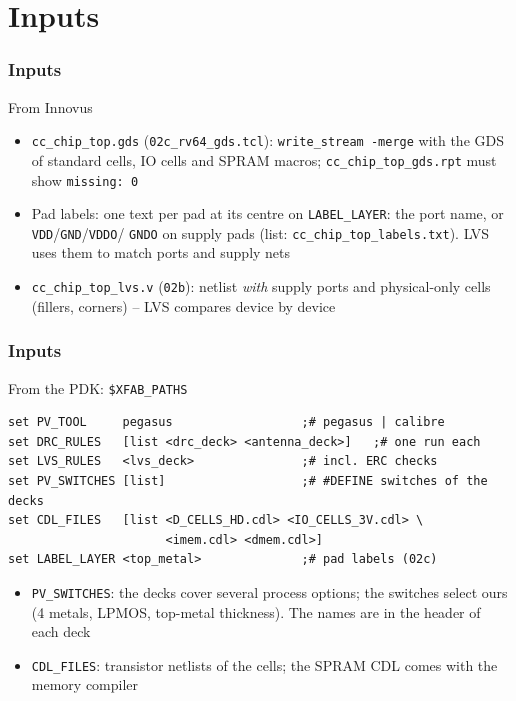 \documentclass{beamer}
\newcommand{\astitle}{nix}
\newcommand{\assubtitle}{nix}
\newcommand{\cmd}[1]{\texttt{#1}}
\begin{document}
\section{Inputs}
\renewcommand{\astitle}{Inputs}

\renewcommand{\assubtitle}{From Innovus}
\begin{frame}
\frametitle{\astitle}
\begin{block}{\assubtitle}
  \begin{itemize}
    \item \cmd{cc\_chip\_top.gds} (\cmd{02c\_rv64\_gds.tcl}):
      \cmd{write\_stream -merge} with the GDS of standard cells, IO cells
      and SPRAM macros; \cmd{cc\_chip\_top\_gds.rpt} must show
      \cmd{missing: 0}
    \item Pad labels: one text per pad at its centre on
      \cmd{LABEL\_LAYER}: the port name, or \cmd{VDD}/\cmd{GND}/\cmd{VDDO}/
      \cmd{GNDO} on supply pads (list: \cmd{cc\_chip\_top\_labels.txt}).
      LVS uses them to match ports and supply nets
    \item \cmd{cc\_chip\_top\_lvs.v} (\cmd{02b}): netlist \emph{with} supply
      ports and physical-only cells (fillers, corners) -- LVS compares
      device by device
  \end{itemize}
\end{block}
\end{frame}

\renewcommand{\assubtitle}{From the PDK: \texttt{\$XFAB\_PATHS}}
\begin{frame}[fragile]
\frametitle{\astitle}
\begin{block}{\assubtitle}
\begin{lstlisting}[style=sh]
set PV_TOOL     pegasus                  ;# pegasus | calibre
set DRC_RULES   [list <drc_deck> <antenna_deck>]   ;# one run each
set LVS_RULES   <lvs_deck>               ;# incl. ERC checks
set PV_SWITCHES [list]                   ;# #DEFINE switches of the decks
set CDL_FILES   [list <D_CELLS_HD.cdl> <IO_CELLS_3V.cdl> \
                      <imem.cdl> <dmem.cdl>]
set LABEL_LAYER <top_metal>              ;# pad labels (02c)
\end{lstlisting}
  \begin{itemize}
    \item \cmd{PV\_SWITCHES}: the decks cover several process options; the
      switches select ours (4 metals, LPMOS, top-metal thickness). The
      names are in the header of each deck
    \item \cmd{CDL\_FILES}: transistor netlists of the cells; the SPRAM
      CDL comes with the memory compiler
  \end{itemize}
\end{block}
\end{frame}
\end{document}
